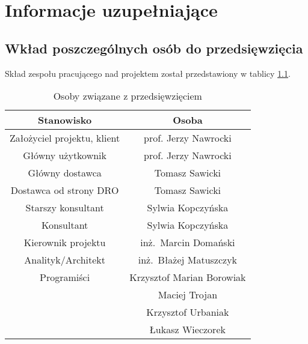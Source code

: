 \chapter{Informacje uzupełniające}
\label{Chapter10}

\section{Wkład poszczególnych osób do przedsięwzięcia}
\label{Chapter101}

Skład zespołu pracującego nad projektem został przedstawiony w tablicy \ref{tab:roster}.

\begin{table}[h]
\centering
\begin{tabular}{ | c | c | }
\hline
\textbf{Stanowisko} & \textbf{Osoba} \\ \hline
Założyciel projektu, klient & prof. Jerzy Nawrocki \\ \hline
Główny użytkownik & prof. Jerzy Nawrocki \\ \hline
Główny dostawca & Tomasz Sawicki \\ \hline
Dostawca od strony DRO & Tomasz Sawicki \\ \hline
Starszy konsultant & Sylwia Kopczyńska \\ \hline
Konsultant & Sylwia Kopczyńska \\ \hline
Kierownik projektu & inż.~Marcin Domański \\ \hline
Analityk/Architekt & inż.~Błażej Matuszczyk \\ \hline
Programiści & Krzysztof Marian Borowiak \\ 
 & Maciej Trojan \\ 
 & Krzysztof Urbaniak \\ 
 & Łukasz Wieczorek \\
\hline
\end{tabular}
\caption{Osoby związane z przedsięwzięciem}\label{tab:roster}
\end{table}

\noindent

